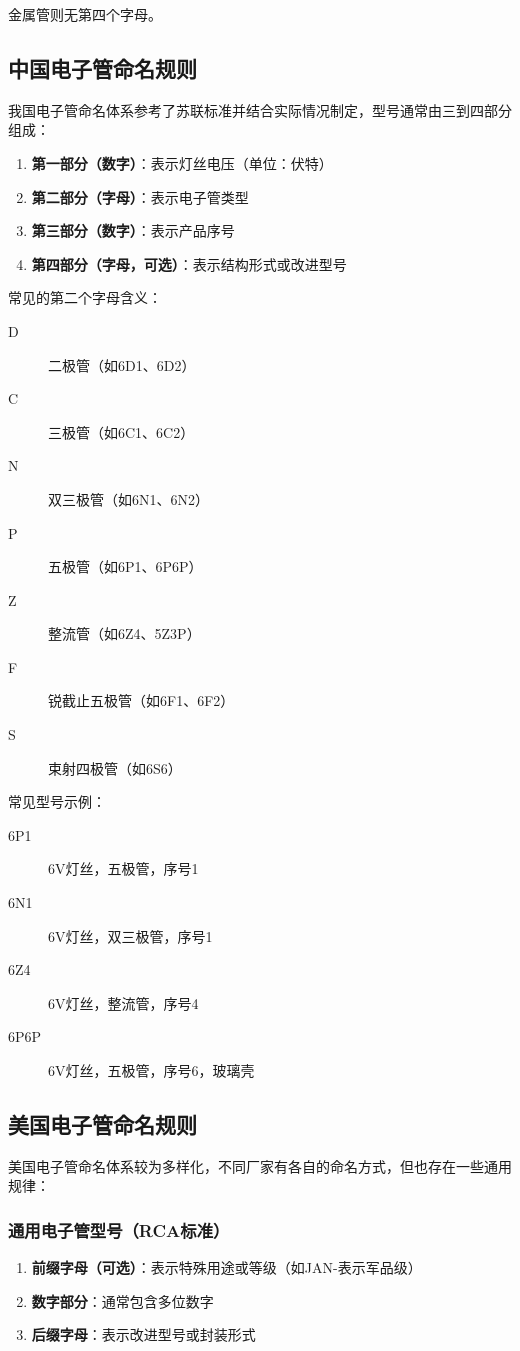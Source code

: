 \documentclass[12pt,UTF8]{ctexbook}
\begin{document}
金属管则无第四个字母。

\subsection{中国电子管命名规则}

我国电子管命名体系参考了苏联标准并结合实际情况制定，型号通常由三到四部分组成：

\begin{enumerate}
    \item \textbf{第一部分（数字）}：表示灯丝电压（单位：伏特）
    \item \textbf{第二部分（字母）}：表示电子管类型
    \item \textbf{第三部分（数字）}：表示产品序号
    \item \textbf{第四部分（字母，可选）}：表示结构形式或改进型号
\end{enumerate}

常见的第二个字母含义：
\begin{description}
    \item[D] 二极管（如6D1、6D2）
    \item[C] 三极管（如6C1、6C2）
    \item[N] 双三极管（如6N1、6N2）
    \item[P] 五极管（如6P1、6P6P）
    \item[Z] 整流管（如6Z4、5Z3P）
    \item[F] 锐截止五极管（如6F1、6F2）
    \item[S] 束射四极管（如6S6）
\end{description}

常见型号示例：
\begin{description}
    \item[6P1] 6V灯丝，五极管，序号1
    \item[6N1] 6V灯丝，双三极管，序号1
    \item[6Z4] 6V灯丝，整流管，序号4
    \item[6P6P] 6V灯丝，五极管，序号6，玻璃壳
\end{description}

\subsection{美国电子管命名规则}

美国电子管命名体系较为多样化，不同厂家有各自的命名方式，但也存在一些通用规律：

\subsubsection{通用电子管型号（RCA标准）}
\begin{enumerate}
    \item \textbf{前缀字母（可选）}：表示特殊用途或等级（如JAN-表示军品级）
    \item \textbf{数字部分}：通常包含多位数字
    \item \textbf{后缀字母}：表示改进型号或封装形式
\end{enumerate}
\end{document}

